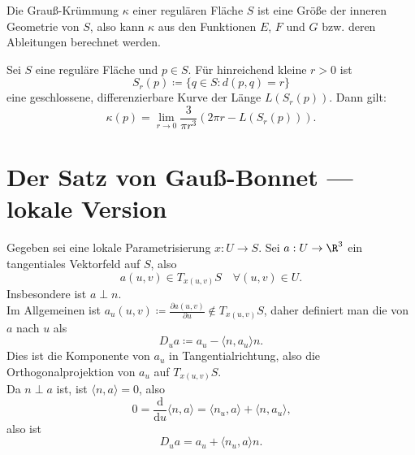 \begin{example}
\begin{enumerate}
  \end{enumerate}
\end{example}

\begin{theorem}
  Die Grauß-Krümmung $ \kappa $ einer regulären Fläche $ S $ ist eine Größe der inneren Geometrie von $ S $, also kann $ \kappa $ aus den Funktionen $ E $, $ F $ und $ G $ bzw. deren Ableitungen berechnet werden.
\end{theorem}

\begin{theorem}
  Sei $ S $ eine reguläre Fläche und $ p \in S $. Für hinreichend kleine $ r > 0 $ ist
  \begin{equation*}
    S_r(p) \coloneqq \{ q \in S : d(p,q) = r \}
  \end{equation*}
  eine geschlossene, differenzierbare Kurve der Länge $ L(S_r(p)) $. Dann gilt:
  \begin{equation*}
    \kappa(p) = \lim_{r \to 0} \frac{3}{\pi r^3}(2\pi r - L(S_r(p)))\text{.}
  \end{equation*}
\end{theorem}

\section{Der Satz von Gauß-Bonnet --- lokale Version}

\begin{definition}
  Gegeben sei eine lokale Parametrisierung $ x: U \to S $. Sei $ a : U \to \R^3 $ ein tangentiales Vektorfeld auf $ S $, also
  \begin{equation*}
    a(u,v) \in T_{x(u,v)}S \quad \forall (u,v) \in U\text{.}
  \end{equation*}
  Insbesondere ist $ a \perp n $. \\
  Im Allgemeinen ist $ a_u(u,v) \coloneqq \frac{\partial a(u,v)}{\partial u} \not \in T_{x(u,v)}S $, daher definiert man die \label{def:kovarianteAbleitung} von $ a $ nach $ u $ als
  \begin{equation*}
    D_ua \coloneqq a_u - \langle n, a_u \rangle n\text{.}
  \end{equation*}
  Dies ist die Komponente von $ a_u $ in Tangentialrichtung, also die Orthogonalprojektion von $ a_u $ auf $ T_{x(u,v)}S $. \\
  Da $ n \perp a $ ist, ist $ \langle n, a \rangle = 0 $, also
  \begin{equation*}
    0 = \frac{\text{d}}{\text{d}u}\langle n,a \rangle = \langle n_u, a \rangle + \langle n, a_u \rangle\text{,}
  \end{equation*}
  also ist
  \begin{equation*}
    D_ua = a_u + \langle n_u, a \rangle n\text{.}
  \end{equation*}
\end{definition}

